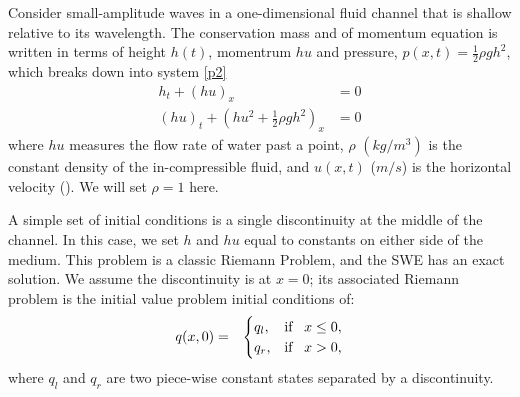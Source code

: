 \documentclass[10pt,a4paper]{article}
\begin{document}
		Consider small-amplitude waves in a one-dimensional fluid channel that is shallow relative to its wavelength. The conservation mass and of momentum equation is written in terms of height $h(t)$, momentrum $hu$ and  pressure, $p(x,t) = \frac{1}{2}\rho gh^{2}$, which breaks down into system \eqref{p2}
	\begin{equation}
		\begin{aligned}
			h_{t} + (hu)_x &= 0 \\
			(hu)_t + \left(hu^{2} + \frac{1}{2}\rho gh^{2} \right)_x & = 0 
		\end{aligned}
		\label{p2}
	\end{equation}	
	where $hu$ measures the flow rate of water past a point,  $\rho$ $(kg/m^{3})$ is the constant density of the in-compressible fluid, and $u(x,t)$ ($m/s$) is the horizontal velocity  (\cite{leveque2002finite,toro2001shock}).  We will set $\rho = 1$ here.
	
	A simple set of initial conditions is a single discontinuity at the middle of the channel.  In this case, we set $h$ and $hu$ equal to constants on either side of the medium.  This problem is a classic Riemann Problem, and the SWE has an exact solution.  We assume the discontinuity is at $x = 0$; its associated Riemann problem is the initial value problem initial conditions of:
		\begin{eqnarray}
		q(x,0)& =& \begin{cases}
			q_{l}, & \text{if \, $x \le 0,$}\\
			q_{r},& \text{if \, $x > 0,$}\\
			
		\end{cases}  
		\label{rp1}     
	\end{eqnarray}
where $q_{l}$ and $q_{r}$ are two piece-wise constant states separated by a discontinuity. 
\end{document}
